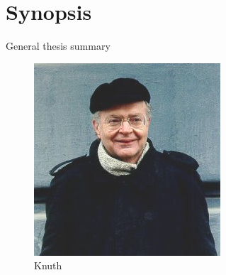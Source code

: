 \chapter*{Synopsis}

\begin{center}
    General thesis summary
\end{center}


\begin{figure}
    \centering
    \includegraphics[width=0.6\linewidth]{images/knuth}
    \caption{Knuth}
    \label{fig:my_label3}
\end{figure}